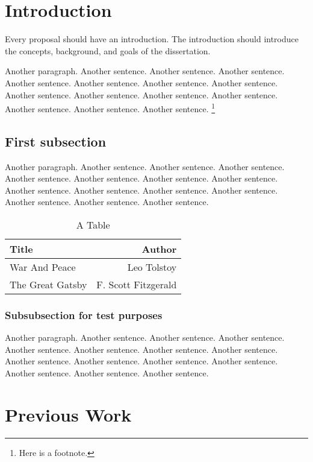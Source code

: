 \documentclass[12pt]{article}
\begin{document}
\section{Introduction}

Every proposal should have an introduction.
The introduction should introduce the concepts, background, and goals of the dissertation.

Another paragraph.
Another sentence. Another sentence. Another sentence. Another sentence. Another sentence. Another sentence. Another sentence. Another sentence. Another sentence. Another sentence. Another sentence. Another sentence. Another sentence. Another sentence.%
\footnote{%
Here is a footnote.}
%





\subsection{First subsection}

Another paragraph.
Another sentence. Another sentence. Another sentence. Another sentence. Another sentence. Another sentence. Another sentence. Another sentence. Another sentence. Another sentence. Another sentence. Another sentence. Another sentence. Another sentence. 

\begin{table}[p]\centering
\caption[Short Caption]{A Table}
\begin{tabular}{lr}\hline\hline
Title & Author \\ \hline
War And Peace & Leo Tolstoy \\
The Great Gatsby & F. Scott Fitzgerald \\ \hline
\end{tabular}
\end{table}


\subsubsection{Subsubsection for test purposes}

Another paragraph.
Another sentence. Another sentence. Another sentence. Another sentence. Another sentence. Another sentence. Another sentence. Another sentence. Another sentence. Another sentence. Another sentence. Another sentence. Another sentence. Another sentence. 



\section{Previous Work}
\end{document}
